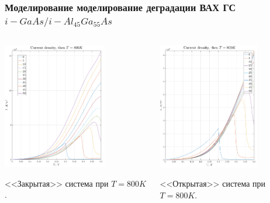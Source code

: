 \documentclass[10pt,pdf,hyperref={unicode},aspectratio={169}]{beamer}
\begin{document}
\begin{frame}
	\frametitle{Моделирование моделирование деградации ВАХ ГС $i\!-\!GaAs/i\!-\!Al_{45}Ga_{55}As$}
	\begin{columns}
		\begin{center}
			\includegraphics[width=0.7\textwidth]{assets/J1DCAlGaAs}

			<<Закрытая>> система при $T = 800K$.
		\end{center}
		\begin{center}
			\includegraphics[width=0.7\textwidth]{assets/J1DOAlGaAs}

			<<Открытая>> система при $T = 800K$.
		\end{center}
	\end{columns}
\end{frame}
\end{document}
